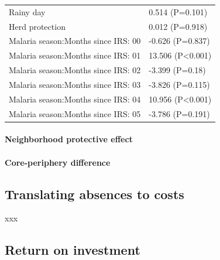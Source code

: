 \documentclass[]{article}
\let\oldparagraph\paragraph
\renewcommand{\paragraph}[1]{\oldparagraph{#1}\mbox{}}
\begin{document}
\begin{longtable}[t]{ll}
\hspace{1em}Rainy day & 0.514 (P=0.101)\\
\hspace{1em}Herd protection & 0.012 (P=0.918)\\
\hspace{1em}Malaria season:Months since IRS: 00 & -0.626 (P=0.837)\\
\hspace{1em}Malaria season:Months since IRS: 01 & 13.506 (P<0.001)\\
\hspace{1em}Malaria season:Months since IRS: 02 & -3.399 (P=0.18)\\
\hspace{1em}Malaria season:Months since IRS: 03 & -3.826 (P=0.115)\\
\hspace{1em}Malaria season:Months since IRS: 04 & 10.956 (P<0.001)\\
\hspace{1em}Malaria season:Months since IRS: 05 & -3.786 (P=0.191)\\*
\end{longtable}

\paragraph{Neighborhood protective
effect}\label{neighborhood-protective-effect}


\paragraph{Core-periphery difference}\label{core-periphery-difference}


\subsection{Translating absences to
costs}\label{translating-absences-to-costs}

xxx

\subsection{Return on investment}\label{return-on-investment}
\end{document}
